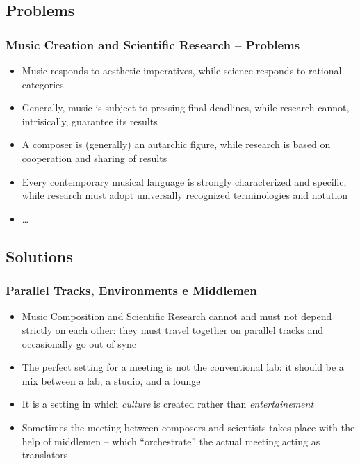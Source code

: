 \subsection{Problems}

\begin{frame}
    \frametitle<+- | alert@+->{\normalsize Music Creation and Scientific Research -- Problems}

    \begin{itemize}[<+- | alert@+->]
				\item Music responds to aesthetic imperatives, while science responds
								to rational categories
				\item Generally, music is subject to pressing final deadlines,
								while research cannot, intrisically, guarantee its results
				\item A composer is (generally) an autarchic figure, while research is
								based on cooperation and sharing of results
				\item Every contemporary musical language is strongly characterized
								and specific, while research must adopt universally recognized
								terminologies and notation
        \item \ldots
    \end{itemize}

\end{frame}

\subsection{Solutions}

\begin{frame}
    \frametitle<+- | alert@+->{Parallel Tracks, Environments e Middlemen}

    \begin{itemize}[<+- | alert@+->]
				\item Music Composition and Scientific Research cannot and must not
								depend strictly on each other: they must travel together on
								parallel tracks and occasionally go out of sync
				\item The perfect setting for a meeting is not the conventional lab:
								it should be a mix between a lab, a studio, and a lounge
				\item It is a setting in which \emph{culture} is created rather than
								\emph{entertainement}
				\item Sometimes the meeting between composers and scientists takes
								place with the help of middlemen -- which ``orchestrate'' the
								actual meeting acting as translators
    \end{itemize}
    
\end{frame}

